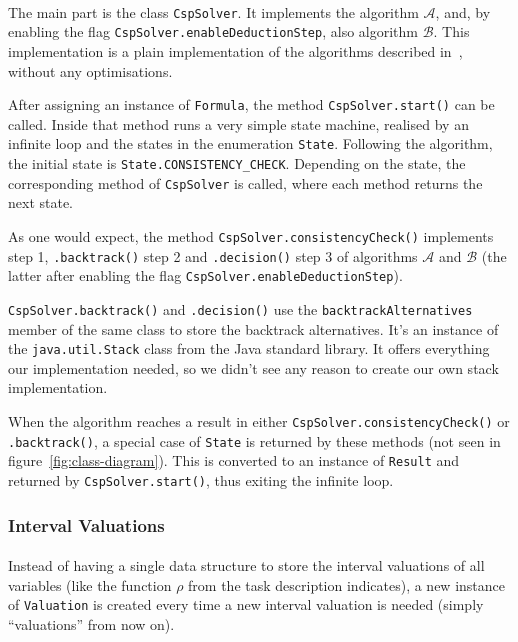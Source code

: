\paragraph{}
The main part is the class \texttt{CspSolver}.
It implements the algorithm $\mathcal{A}$, and, by enabling the flag \texttt{CspSolver.enableDeductionStep}, also algorithm $\mathcal{B}$. This implementation is a plain implementation of the algorithms described in~\cite{MF19}, without any optimisations.

After assigning an instance of \texttt{Formula}, the method \texttt{CspSolver.start()} can be called.
Inside that method runs a very simple state machine, realised by an infinite loop and the states in the enumeration \texttt{State}.
Following the algorithm, the initial state is \texttt{State.CONSISTENCY\_CHECK}.
Depending on the state, the corresponding method of \texttt{CspSolver} is called, where each method returns the next state.

As one would expect, the method \texttt{CspSolver.consistencyCheck()} implements step 1, \texttt{.backtrack()} step 2 and \texttt{.decision()} step 3 of algorithms $\mathcal{A}$ and $\mathcal{B}$ (the latter after enabling the flag \texttt{CspSolver.enableDeductionStep}).

\texttt{CspSolver.backtrack()} and \texttt{.decision()} use the \texttt{backtrackAlternatives} member of the same class to store the backtrack alternatives.
It's an instance of the \texttt{java.util.Stack} class from the Java standard library.
It offers everything our implementation needed, so we didn't see any reason to create our own stack implementation.

When the algorithm reaches a result in either \texttt{CspSolver.consistencyCheck()} or \texttt{.backtrack()}, a special case of \texttt{State} is returned by these methods (not seen in figure~\ref{fig:class-diagram}).
This is converted to an instance of \texttt{Result} and returned by \texttt{CspSolver.start()}, thus exiting the infinite loop.


\subsubsection{Interval Valuations}\label{ssec:valuations}

\paragraph{}
Instead of having a single data structure to store the interval valuations of all variables (like the function $\rho$ from the task description indicates), a new instance of \texttt{Valuation} is created every time a new interval valuation is needed (simply ``valuations'' from now on).


